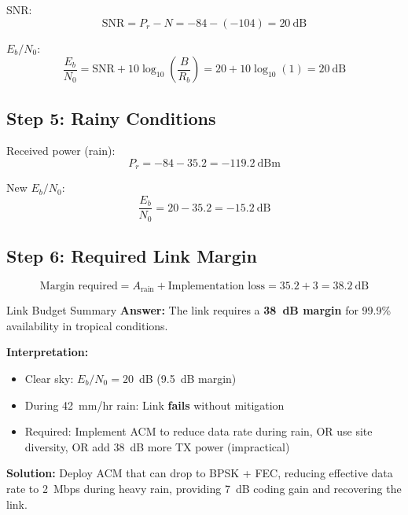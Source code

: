 SNR:
\begin{equation}
\text{SNR} = P_r - N = -84 - (-104) = 20~\text{dB}
\end{equation}

$E_b/N_0$:
\begin{equation}
\frac{E_b}{N_0} = \text{SNR} + 10\log_{10}\left(\frac{B}{R_b}\right) = 20 + 10\log_{10}(1) = 20~\text{dB}
\end{equation}

\subsection*{Step 5: Rainy Conditions}

Received power (rain):
\begin{equation}
P_r = -84 - 35.2 = -119.2~\text{dBm}
\end{equation}

New $E_b/N_0$:
\begin{equation}
\frac{E_b}{N_0} = 20 - 35.2 = -15.2~\text{dB}
\end{equation}

\subsection*{Step 6: Required Link Margin}

\begin{equation}
\text{Margin required} = A_{\text{rain}} + \text{Implementation loss} = 35.2 + 3 = 38.2~\text{dB}
\end{equation}

\begin{calloutbox}[colback=black!8!white,colframe=black]{Link Budget Summary}
\textbf{Answer:} The link requires a \textbf{38~dB margin} for 99.9\% availability in tropical conditions.

\textbf{Interpretation:}
\begin{itemize}
\item Clear sky: $E_b/N_0 = 20$~dB (9.5~dB margin)
\item During 42~mm/hr rain: Link \textbf{fails} without mitigation
\item Required: Implement ACM to reduce data rate during rain, OR use site diversity, OR add 38~dB more TX power (impractical)
\end{itemize}

\textbf{Solution:} Deploy ACM that can drop to BPSK + FEC, reducing effective data rate to 2~Mbps during heavy rain, providing 7~dB coding gain and recovering the link.
\end{calloutbox}


